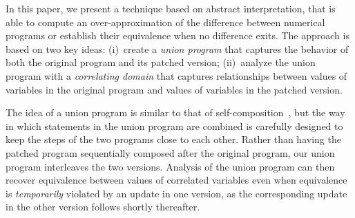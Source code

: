 




In this paper, we present a technique based on abstract interpretation, that
is able to compute an over-approximation of the difference between numerical
programs or establish their equivalence when no difference exits. The
approach is based on two key ideas: (i)~create a \emph{union program} that
captures the behavior of both the original program and its patched version;
(ii)~analyze the union program with a \emph{correlating domain} that captures
relationships between values of variables in the original program and values
of variables in the patched version.

The idea of a union program is similar to that of
self-composition~\cite{BartheDArgenioRezk04,AikenTerauchi05}, but the way in
which statements in the union program are combined is carefully designed to
keep the steps of the two programs close to each other. Rather than having
the patched program sequentially composed after the original program, our
union program interleaves the two versions. Analysis of the union program can
then recover equivalence between values of correlated variables even when
equivalence is \emph{temporarily} violated by an update in one version, as
the corresponding update in the other version follows shortly thereafter.




